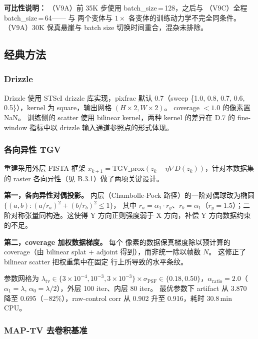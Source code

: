 \textbf{可比性说明：} （V9A）前 35K 步使用 batch\_size\,=\,128，之后与 （V9C）全程 batch\_size\,=\,64—— 与  两个变体与 \(1\times\) 各变体的训练动力学不完全同条件。
（V9A）30K 保真悬崖与 batch size 切换时间重合，混杂未排除。

\subsection{经典方法}

\subsubsection{Drizzle}

Drizzle 使用 STScI drizzle 库实现，pixfrac 默认 0.7（sweep \{1.0, 0.8, 0.7, 0.6, 0.5\}），kernel 为 square，输出网格 \((H \times 2, W \times 2)\)。
coverage \(< 1.0\) 的像素置 NaN。 训练侧的 scatter 使用 bilinear kernel，两种 kernel 的差异在 D.7 的 fine-window 指标中以 drizzle 输入通道参照点的形式体现。

\subsubsection{各向异性 TGV}

 重建采用外层 FISTA 框架 \(x_{k+1} = \text{TGV\_prox}(z_k - \eta \nabla D(z_k))\)，针对本数据集的 raster 各向异性（见 B.3.1）做了两项关键设计。

\textbf{第一，各向异性对偶投影。}  内层（Chambolle-Pock 路径）的一阶对偶球改为椭圆 \(\{(a,b) : (a/r_a)^2 + (b/r_b)^2 \le 1\}\)，
其中 \(r_a = \alpha_1 \cdot r_y\)、\(r_b = \alpha_1\)（\(r_y = 1.5\)）；二阶对称张量同构造。这使得 Y 方向正则强度弱于 X 方向，补偿 Y 方向数据约束的不足。

\textbf{第二，coverage 加权数据梯度。} 每个  像素的数据保真梯度除以预计算的 coverage（由 bilinear splat \(+\)  adjoint 得到），而非统一除以帧数 \(N\)。
这修正了 bilinear scatter 把权重集中在固定  行上所导致的水平条纹。

参数网格为 \(\lambda_{\text{tv}} \in \{3 \times 10^{-4}, 10^{-3}, 3 \times 10^{-3}\} \times \sigma_{\text{PSF}} \in \{0.18, 0.50\}\)，\(\alpha_{\text{ratio}} = 2.0\)（\(\alpha_1 = \lambda\), \(\alpha_0 = \lambda/2\)），外层 100 iter、内层 80 iter。
最优参数下 artifact 从 3.870 降至 0.695（\(-82\%\)），raw-control corr 从 0.902 升至 0.916，耗时 30.8\,min CPU。

\subsubsection{MAP-TV 去卷积基准}

